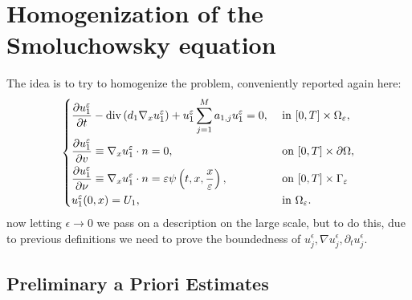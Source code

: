 \section{Homogenization of the Smoluchowsky equation}
The idea is to try to homogenize the problem, conveniently reported again here:
\begin{equation}
    \begin{dcases}\frac{\partial u_{1}^{\epsilon}}{\partial t}-\operatorname{div}\left(d_{1} \nabla_{x} u_{1}^{\epsilon}\right)+u_{1}^{\epsilon} \sum_{j=1}^{M} a_{1, j} u_{1}^{\epsilon}=0, & \text { in }[0, T] \times \Omega_{\epsilon}, \\ 
    \frac{\partial u_{1}^{\epsilon}}{\partial v} \equiv \nabla_{x} u_{1}^{\epsilon} \cdot n=0, & \text { on }[0, T]\times\partial\Omega,\\ 
    \frac{\partial u_{1}^{\epsilon}}{\partial \nu} \equiv \nabla_{x} u_{1}^{\epsilon} \cdot n=\epsilon \psi\left(t, x, \frac{x}{\epsilon}\right), & \text { on }[0, T] \times \Gamma_{\epsilon} \\ u_{1}^{\epsilon}(0, x)=U_{1}, & \text { in } \Omega_{\epsilon}.
    \end{dcases}
\label{eq 10}\end{equation}
now letting $\epsilon \rightarrow 0$ we pass on a description on the large scale, but to do this, due to previous definitions we need to prove the boundedness of $u_{j}^{\epsilon}, \nabla u_{j}^{\epsilon}, \partial_{t} u_{j}^{\epsilon}$.

\subsection{Preliminary a Priori Estimates}

